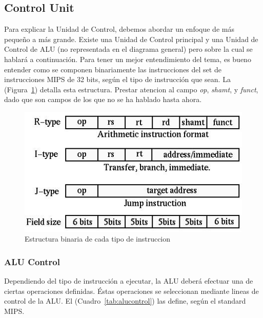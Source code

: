 \documentclass[12pt]{article}
\begin{document}
\subsection{Control Unit}

Para explicar la Unidad de Control, debemos abordar un enfoque de más pequeño a más grande. Existe una Unidad de Control principal y una Unidad de Control de ALU (no representada en el diagrama general) pero sobre la cual se hablará a continuación. Para tener un mejor entendimiento del tema, es bueno entender como se componen binariamente las instrucciones del set de instrucciones MIPS de 32 bits, según el tipo de instrucción que sean. La (Figura~\ref{fig:instrucciones}) detalla esta estructura. Prestar atencion al campo \textit{op}, \textit{shamt}, y \textit{funct}, dado que son campos de los que no se ha hablado hasta ahora.

\begin{figure}[ht]
\centering
\hspace*{-1cm}
\includegraphics[width=.5\textwidth]{imagenes/estructura_instrucciones.jpeg}
\caption{Estructura binaria de cada tipo de instruccion}
\label{fig:instrucciones}
\end{figure}

\subsubsection{ALU Control}

Dependiendo del tipo de instrucción a ejecutar, la ALU deberá efectuar una de ciertas operaciones definidas. Éstas operaciones se seleccionan mediante lineas de control de la ALU. El (Cuadro~\ref{tab:alucontrol}) las define, según el standard MIPS.
\end{document}
